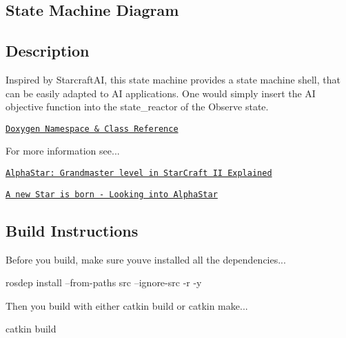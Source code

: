 \subsection*{State Machine Diagram}



\subsection*{Description}

Inspired by Starcraft\+AI, this state machine provides a state machine shell, that can be easily adapted to AI applications. One would simply insert the AI objective function into the state\+\_\+reactor of the Observe state.~\newline


\href{https://reelrbtx.github.io/SMACC_Documentation/master/html/namespacesm__starcraft__ai.html}{\tt Doxygen Namespace \& Class Reference}

For more information see...

\href{https://www.google.com/url?sa=t&rct=j&q=&esrc=s&source=web&cd=10&ved=2ahUKEwiThZKprvvnAhVLvZ4KHbKFDHkQFjAJegQIBxAB&url=https%3A%2F%2Fychai.uk%2Fslides%2F2019-11-12-AlphaStarII.pdf&usg=AOvVaw0jRIVMd3gdb4fM4mmQ4nG1l}{\tt Alpha\+Star\+: Grandmaster level in Star\+Craft II Explained}

\href{https://www.google.com/url?sa=t&rct=j&q=&esrc=s&source=web&cd=1&cad=rja&uact=8&ved=2ahUKEwiqtLHorvvnAhUNs54KHZyOBtMQFjAAegQIBhAB&url=https%3A%2F%2Fhci.iwr.uni-heidelberg.de%2Fsystem%2Ffiles%2Fprivate%2Fdownloads%2F1448422913%2Freport_johannes_daub.pdf&usg=AOvVaw1ZfV12L1svm6sYG7Y2E9Wj}{\tt A new Star is born -\/ Looking into Alpha\+Star}

\subsection*{Build Instructions}

Before you build, make sure you\textquotesingle{}ve installed all the dependencies...


\begin{DoxyCode}
rosdep install --from-paths src --ignore-src -r -y 
\end{DoxyCode}


Then you build with either catkin build or catkin make...


\begin{DoxyCode}
catkin build
\end{DoxyCode}


